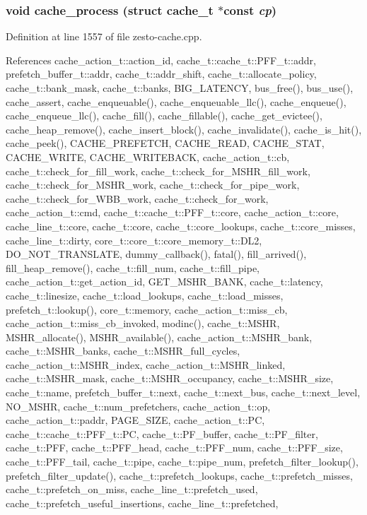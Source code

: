 \subsubsection[{cache\_\-process}]{\setlength{\rightskip}{0pt plus 5cm}void cache\_\-process (struct {\bf cache\_\-t} $\ast$const  {\em cp})}\label{zesto-cache_8cpp_93ce14ef87e7565964216ea27d912147}




Definition at line 1557 of file zesto-cache.cpp.

References cache\_\-action\_\-t::action\_\-id, cache\_\-t::cache\_\-t::PFF\_\-t::addr, prefetch\_\-buffer\_\-t::addr, cache\_\-t::addr\_\-shift, cache\_\-t::allocate\_\-policy, cache\_\-t::bank\_\-mask, cache\_\-t::banks, BIG\_\-LATENCY, bus\_\-free(), bus\_\-use(), cache\_\-assert, cache\_\-enqueuable(), cache\_\-enqueuable\_\-llc(), cache\_\-enqueue(), cache\_\-enqueue\_\-llc(), cache\_\-fill(), cache\_\-fillable(), cache\_\-get\_\-evictee(), cache\_\-heap\_\-remove(), cache\_\-insert\_\-block(), cache\_\-invalidate(), cache\_\-is\_\-hit(), cache\_\-peek(), CACHE\_\-PREFETCH, CACHE\_\-READ, CACHE\_\-STAT, CACHE\_\-WRITE, CACHE\_\-WRITEBACK, cache\_\-action\_\-t::cb, cache\_\-t::check\_\-for\_\-fill\_\-work, cache\_\-t::check\_\-for\_\-MSHR\_\-fill\_\-work, cache\_\-t::check\_\-for\_\-MSHR\_\-work, cache\_\-t::check\_\-for\_\-pipe\_\-work, cache\_\-t::check\_\-for\_\-WBB\_\-work, cache\_\-t::check\_\-for\_\-work, cache\_\-action\_\-t::cmd, cache\_\-t::cache\_\-t::PFF\_\-t::core, cache\_\-action\_\-t::core, cache\_\-line\_\-t::core, cache\_\-t::core, cache\_\-t::core\_\-lookups, cache\_\-t::core\_\-misses, cache\_\-line\_\-t::dirty, core\_\-t::core\_\-t::core\_\-memory\_\-t::DL2, DO\_\-NOT\_\-TRANSLATE, dummy\_\-callback(), fatal(), fill\_\-arrived(), fill\_\-heap\_\-remove(), cache\_\-t::fill\_\-num, cache\_\-t::fill\_\-pipe, cache\_\-action\_\-t::get\_\-action\_\-id, GET\_\-MSHR\_\-BANK, cache\_\-t::latency, cache\_\-t::linesize, cache\_\-t::load\_\-lookups, cache\_\-t::load\_\-misses, prefetch\_\-t::lookup(), core\_\-t::memory, cache\_\-action\_\-t::miss\_\-cb, cache\_\-action\_\-t::miss\_\-cb\_\-invoked, modinc(), cache\_\-t::MSHR, MSHR\_\-allocate(), MSHR\_\-available(), cache\_\-action\_\-t::MSHR\_\-bank, cache\_\-t::MSHR\_\-banks, cache\_\-t::MSHR\_\-full\_\-cycles, cache\_\-action\_\-t::MSHR\_\-index, cache\_\-action\_\-t::MSHR\_\-linked, cache\_\-t::MSHR\_\-mask, cache\_\-t::MSHR\_\-occupancy, cache\_\-t::MSHR\_\-size, cache\_\-t::name, prefetch\_\-buffer\_\-t::next, cache\_\-t::next\_\-bus, cache\_\-t::next\_\-level, NO\_\-MSHR, cache\_\-t::num\_\-prefetchers, cache\_\-action\_\-t::op, cache\_\-action\_\-t::paddr, PAGE\_\-SIZE, cache\_\-action\_\-t::PC, cache\_\-t::cache\_\-t::PFF\_\-t::PC, cache\_\-t::PF\_\-buffer, cache\_\-t::PF\_\-filter, cache\_\-t::PFF, cache\_\-t::PFF\_\-head, cache\_\-t::PFF\_\-num, cache\_\-t::PFF\_\-size, cache\_\-t::PFF\_\-tail, cache\_\-t::pipe, cache\_\-t::pipe\_\-num, prefetch\_\-filter\_\-lookup(), prefetch\_\-filter\_\-update(), cache\_\-t::prefetch\_\-lookups, cache\_\-t::prefetch\_\-misses, cache\_\-t::prefetch\_\-on\_\-miss, cache\_\-line\_\-t::prefetch\_\-used, cache\_\-t::prefetch\_\-useful\_\-insertions, cache\_\-line\_\-t::prefetched, 